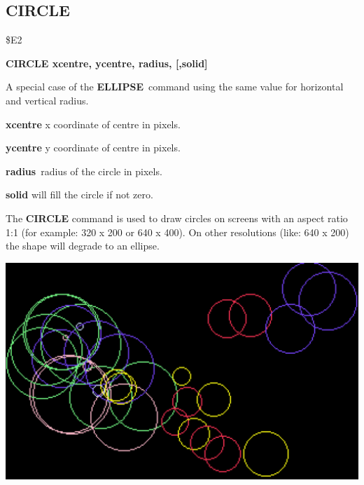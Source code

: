 \subsection{CIRCLE}
\begin{description}[leftmargin=2cm,style=nextline]
\item [Token:] \$E2
\item [Format:] {\bf CIRCLE xcentre, ycentre, radius, [,solid]}
\item [Usage:] A special case of
               the {\bf ELLIPSE} command using the same value for
               horizontal and vertical radius.

               {\bf xcentre} x coordinate of centre in pixels.

               {\bf ycentre} y coordinate of centre in pixels.

               {\bf radius} radius of the circle in pixels.

               {\bf solid} will fill the circle if not zero.

\item [Remarks:] The {\bf CIRCLE} command is used to draw circles on
               screens with an aspect ratio 1:1 (for example: 320 x 200
               or 640 x 400). On other resolutions (like: 640 x 200)
               the shape will degrade to an ellipse.

\includegraphics[width=\linewidth]{images/circle.png}
\newpage


\end{description}

